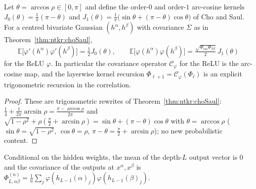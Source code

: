 \begin{theorem}\label{thm:ntkdeep:arccos}
  \leanok
Let $\theta=\arccos\rho\in[0,\pi]$ and define the order-$0$ and order-$1$ arc-cosine kernels $J_0(\theta)=\frac1\pi(\pi-\theta)$ and $J_1(\theta)=\frac1\pi\bigl(\sin\theta+(\pi-\theta)\cos\theta\bigr)$ of Cho and Saul. For a centred bivariate Gaussian $(h^\alpha,h^\beta)$ with covariance $\Sigma$ as in Theorem~\ref{thm:ntkr:choSaul},
\[
  \mathbb E\bigl[\varphi'(h^\alpha)\varphi'(h^\beta)\bigr]=\tfrac12J_0(\theta),\qquad
  \mathbb E\bigl[\varphi(h^\alpha)\varphi(h^\beta)\bigr]=\tfrac{\sqrt{\Phi_{\alpha\alpha}\Phi_{\beta\beta}}}2\,J_1(\theta)
\]
for the ReLU $\varphi$. In particular the covariance operator $\mathcal C_\varphi$ for the ReLU is the arc-cosine map, and the layerwise kernel recursion $\Phi_{\ell+1}=\mathcal C_\varphi(\Phi_\ell)$ is an explicit trigonometric recursion in the correlation.
\end{theorem}

\begin{proof}
  \leanok
These are trigonometric rewrites of Theorem~\ref{thm:ntkr:choSaul}: $\frac14+\frac1{2\pi}\arcsin\rho=\frac{\pi-\arccos\rho}{2\pi}$ and $\sqrt{1-\rho^2}+\rho(\frac\pi2+\arcsin\rho)=\sin\theta+(\pi-\theta)\cos\theta$ with $\theta=\arccos\rho$ ($\sin\theta=\sqrt{1-\rho^2}$, $\cos\theta=\rho$, $\pi-\theta=\frac\pi2+\arcsin\rho$); no new probabilistic content.
\end{proof}

\begin{lemma}\label{lem:ntkdeep:deepConditionalMoments}
  \leanok
Conditional on the hidden weights, the mean of the depth-$L$ output vector is $0$ and the covariance of the outputs at $x^\alpha,x^\beta$ is $\Phi^{(n)}_{L,\alpha\beta}=\frac1n\sum_j\varphi(h_{L-1}(\alpha)_j)\varphi(h_{L-1}(\beta)_j)$.
\end{lemma}
